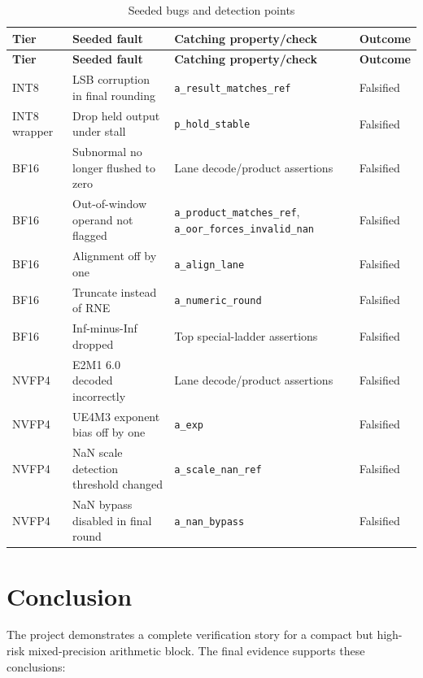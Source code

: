 \documentclass[11pt,oneside]{report}
\begin{document}
\begin{longtable}{p{}p{}p{}p{}}
\caption{Seeded bugs and detection points}\\
\toprule
\textbf{Tier} & \textbf{Seeded fault} & \textbf{Catching property/check} & \textbf{Outcome} \\
\midrule
\endfirsthead
\toprule
\textbf{Tier} & \textbf{Seeded fault} & \textbf{Catching property/check} & \textbf{Outcome} \\
\midrule
\endhead
INT8 & LSB corruption in final rounding & \texttt{a\_result\_matches\_ref} & Falsified \\
INT8 wrapper & Drop held output under stall & \texttt{p\_hold\_stable} & Falsified \\
BF16 & Subnormal no longer flushed to zero & Lane decode/product assertions & Falsified \\
BF16 & Out-of-window operand not flagged & \texttt{a\_product\_matches\_ref}, \texttt{a\_oor\_forces\_invalid\_nan} & Falsified \\
BF16 & Alignment off by one & \texttt{a\_align\_lane} & Falsified \\
BF16 & Truncate instead of RNE & \texttt{a\_numeric\_round} & Falsified \\
BF16 & Inf-minus-Inf dropped & Top special-ladder assertions & Falsified \\
NVFP4 & E2M1 6.0 decoded incorrectly & Lane decode/product assertions & Falsified \\
NVFP4 & UE4M3 exponent bias off by one & \texttt{a\_exp} & Falsified \\
NVFP4 & NaN scale detection threshold changed & \texttt{a\_scale\_nan\_ref} & Falsified \\
NVFP4 & NaN bypass disabled in final round & \texttt{a\_nan\_bypass} & Falsified \\
\bottomrule
\end{longtable}

\chapter{Conclusion}

The project demonstrates a complete verification story for a compact but
high-risk mixed-precision arithmetic block. The final evidence supports these
conclusions:
\end{document}
